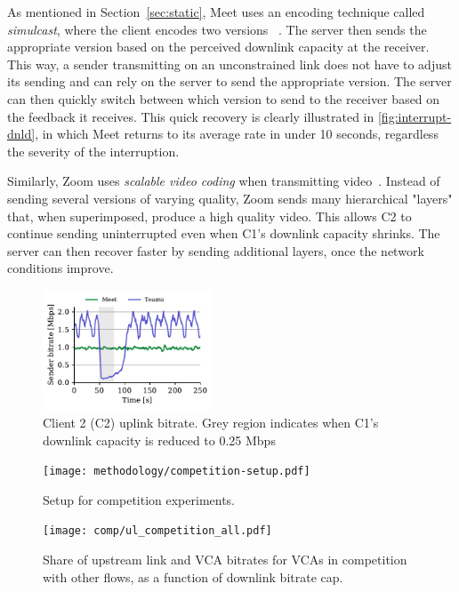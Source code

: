 As mentioned in Section~\ref{sec:static}, Meet uses an encoding technique called \textit{simulcast}, where the client encodes two versions ~\cite{nistico2020comparative}. The server then sends the appropriate version based on the perceived downlink capacity at the receiver. This way, a sender transmitting on an unconstrained link does not have to adjust its sending and can rely on the server to send the appropriate version. The server can then quickly switch between which version to send to the receiver based on the feedback it receives. This quick recovery is clearly illustrated in \ref{fig:interrupt-dnld}, in which Meet returns to its average rate in under 10 seconds, regardless the severity of the interruption.

Similarly, Zoom uses \textit{scalable video coding} when transmitting video~\cite{zoom_encoding}. Instead of sending several versions of varying quality, Zoom sends many hierarchical "layers" that, when superimposed, produce a high quality video. This allows C2 to continue sending uninterrupted even when C1's downlink capacity shrinks. The server can then recover faster by sending additional layers, once the network conditions improve.  

\begin{figure}[t]
    \centering
    \includegraphics[width=0.45\textwidth,keepaspectratio]{../figures/interrupt/Interrupt-sender.pdf}
    \caption{Client 2 (C2) uplink bitrate. Grey region indicates when C1's downlink capacity is reduced to 0.25 Mbps}
    \label{fig:interrupt-sender}
\end{figure}


\begin{figure}[]
   \centering
    \texttt{[image: methodology/competition-setup.pdf]}
    \caption{Setup for competition experiments.}
    \label{fig:competition-setup}
\end{figure}

 \begin{figure}[t]
    \texttt{[image: comp/ul\_competition\_all.pdf]}
    \caption{Share of upstream link and VCA bitrates for VCAs in competition with other flows, as a function of downlink bitrate cap.}
	\label{fig:comp_bitrates_ul}
\end{figure}


